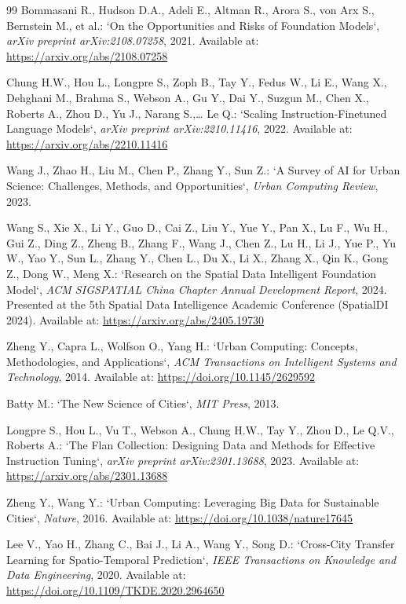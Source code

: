 \documentclass[a4paper,fleqn]{cas-sc}
\begin{document}
\begin{thebibliography}{99}
Bommasani R., Hudson D.A., Adeli E., Altman R., Arora S., von Arx S., Bernstein M., et al.:  
`On the Opportunities and Risks of Foundation Models`, \textit{arXiv preprint arXiv:2108.07258}, 2021.  
Available at: \url{https://arxiv.org/abs/2108.07258}

Chung H.W., Hou L., Longpre S., Zoph B., Tay Y., Fedus W., Li E., Wang X., Dehghani M., Brahma S., Webson A., Gu Y., Dai Y., Suzgun M., Chen X., Roberts A., Zhou D., Yu J., Narang S.,… Le Q.:  
`Scaling Instruction-Finetuned Language Models`, \textit{arXiv preprint arXiv:2210.11416}, 2022.  
Available at: \url{https://arxiv.org/abs/2210.11416}

Wang J., Zhao H., Liu M., Chen P., Zhang Y., Sun Z.:  
`A Survey of AI for Urban Science: Challenges, Methods, and Opportunities`, \textit{Urban Computing Review}, 2023.

Wang S., Xie X., Li Y., Guo D., Cai Z., Liu Y., Yue Y., Pan X., Lu F., Wu H., Gui Z., Ding Z., Zheng B., Zhang F., Wang J., Chen Z., Lu H., Li J., Yue P., Yu W., Yao Y., Sun L., Zhang Y., Chen L., Du X., Li X., Zhang X., Qin K., Gong Z., Dong W., Meng X.:  
`Research on the Spatial Data Intelligent Foundation Model`, \textit{ACM SIGSPATIAL China Chapter Annual Development Report}, 2024. Presented at the 5th Spatial Data Intelligence Academic Conference (SpatialDI 2024). Available at: \url{https://arxiv.org/abs/2405.19730}

Zheng Y., Capra L., Wolfson O., Yang H.:  
`Urban Computing: Concepts, Methodologies, and Applications`,  
\textit{ACM Transactions on Intelligent Systems and Technology}, 2014.  
Available at: \url{https://doi.org/10.1145/2629592}

Batty M.:  
`The New Science of Cities`,  
\textit{MIT Press}, 2013.

Longpre S., Hou L., Vu T., Webson A., Chung H.W., Tay Y., Zhou D., Le Q.V., Roberts A.:  
`The Flan Collection: Designing Data and Methods for Effective Instruction Tuning`,  
\textit{arXiv preprint arXiv:2301.13688}, 2023.  
Available at: \url{https://arxiv.org/abs/2301.13688}

Zheng Y., Wang Y.:  
`Urban Computing: Leveraging Big Data for Sustainable Cities`,  
\textit{Nature}, 2016.  
Available at: \url{https://doi.org/10.1038/nature17645}

Lee V., Yao H., Zhang C., Bai J., Li A., Wang Y., Song D.:  
`Cross-City Transfer Learning for Spatio-Temporal Prediction`,  
\textit{IEEE Transactions on Knowledge and Data Engineering}, 2020.  
Available at: \url{https://doi.org/10.1109/TKDE.2020.2964650}


\end{thebibliography}
\end{document}
